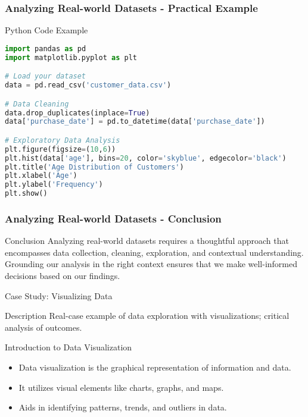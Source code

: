 \documentclass[aspectratio=169]{beamer}
\begin{document}
\begin{frame}[fragile]
    \frametitle{Analyzing Real-world Datasets - Practical Example}
    \begin{block}{Python Code Example}
        \begin{lstlisting}[language=Python]
import pandas as pd
import matplotlib.pyplot as plt

# Load your dataset
data = pd.read_csv('customer_data.csv')

# Data Cleaning
data.drop_duplicates(inplace=True)
data['purchase_date'] = pd.to_datetime(data['purchase_date'])

# Exploratory Data Analysis
plt.figure(figsize=(10,6))
plt.hist(data['age'], bins=20, color='skyblue', edgecolor='black')
plt.title('Age Distribution of Customers')
plt.xlabel('Age')
plt.ylabel('Frequency')
plt.show()
        \end{lstlisting}
    \end{block}
\end{frame}

\begin{frame}[fragile]
    \frametitle{Analyzing Real-world Datasets - Conclusion}
    \begin{block}{Conclusion}
        Analyzing real-world datasets requires a thoughtful approach that encompasses data collection, cleaning, exploration, and contextual understanding. Grounding our analysis in the right context ensures that we make well-informed decisions based on our findings. 
    \end{block}
\end{frame}

\begin{frame}{Case Study: Visualizing Data}
  \begin{block}{Description}
    Real-case example of data exploration with visualizations; critical analysis of outcomes.
  \end{block}
\end{frame}

\begin{frame}{Introduction to Data Visualization}
  \begin{itemize}
    \item Data visualization is the graphical representation of information and data.
    \item It utilizes visual elements like charts, graphs, and maps.
    \item Aids in identifying patterns, trends, and outliers in data.
  \end{itemize}
\end{frame}
\end{document}

